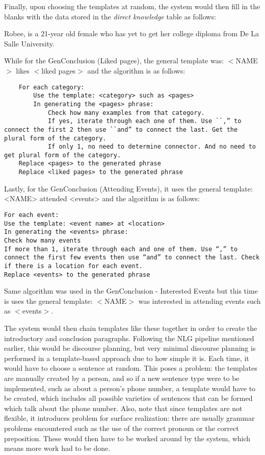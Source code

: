 Finally, upon choosing the templates at random, the system would then fill in the blanks with the data stored in the \textit{direct knowledge} table as follows:

\begin{center} Robee, is a 21-year old female who has yet to get her college diploma from De La Salle University. \end{center}

While for the GenConclusion (Liked pages), the general template was: $<$NAME$>$ likes $<$liked pages$>$ and the algorithm is as follows:
\begin{lstlisting}
	For each category:
		Use the template: <category> such as <pages>
		In generating the <pages> phrase:
			Check how many examples from that category.
			If yes, iterate through each one of them. Use ``,” to connect the first 2 then use ``and” to connect the last. Get the plural form of the category.
			If only 1, no need to determine connector. And no need to get plural form of the category.
	Replace <pages> to the generated phrase
	Replace <liked pages> to the generated phrase
\end{lstlisting}

Lastly, for the GenConclusion (Attending Events), it uses the general template: <NAME> attended <events> and the algorithm is as follows:

\begin{lstlisting}
For each event:
Use the template: <event name> at <location>
In generating the <events> phrase:
Check how many events
If more than 1, iterate through each and one of them. Use “,” to connect the first few events then use “and” to connect the last. Check if there is a location for each event.
Replace <events> to the generated phrase
\end{lstlisting}

Same algorithm was used in the GenConclusion - Interested Events but this time is uses the general template: $<$NAME$>$ was interested in attending events such as $<$events$>$.

The system would then chain templates like these together in order to create the introductory and conclusion paragraphs. Following the NLG pipeline mentioned earlier, this would be discourse planning, but very minimal discourse planning is performed in a template-based approach due to how simple it is.  Each time, it would have to choose a sentence at random. This poses a problem: the templates are manually created by a person, and so if a new sentence type were to be implemented, such as about a person's phone number, a template would have to be created, which includes all possible varieties of sentences that can be formed which talk about the phone number. Also, note that since templates are not flexible, it introduces problem for surface realization: there are usually grammar problems encountered such as the use of the correct pronoun or the correct preposition. These would then have to be worked around by the system, which means more work had to be done.

